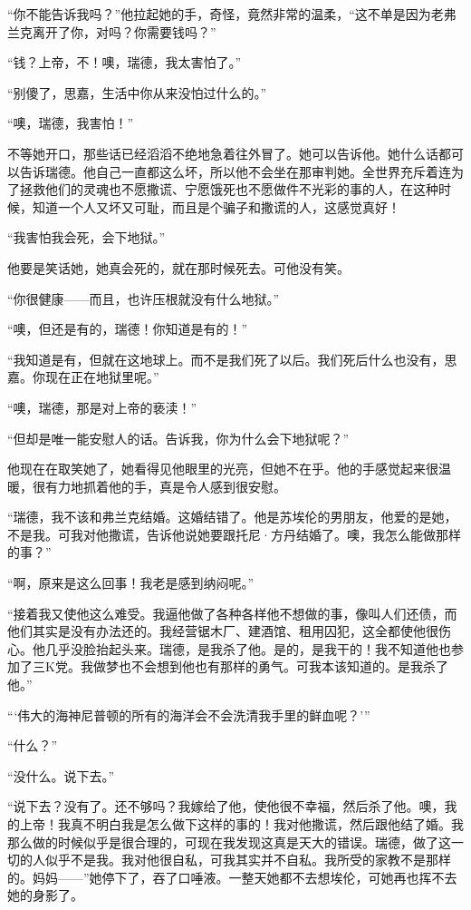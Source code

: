\par “你不能告诉我吗？”他拉起她的手，奇怪，竟然非常的温柔，“这不单是因为老弗兰克离开了你，对吗？你需要钱吗？”
\par “钱？上帝，不！噢，瑞德，我太害怕了。”
\par “别傻了，思嘉，生活中你从来没怕过什么的。”
\par “噢，瑞德，我害怕！”
\par 不等她开口，那些话已经滔滔不绝地急着往外冒了。她可以告诉他。她什么话都可以告诉瑞德。他自己一直都这么坏，所以他不会坐在那审判她。全世界充斥着连为了拯救他们的灵魂也不愿撒谎、宁愿饿死也不愿做件不光彩的事的人，在这种时候，知道一个人又坏又可耻，而且是个骗子和撒谎的人，这感觉真好！
\par “我害怕我会死，会下地狱。”
\par 他要是笑话她，她真会死的，就在那时候死去。可他没有笑。
\par “你很健康——而且，也许压根就没有什么地狱。”
\par “噢，但还是有的，瑞德！你知道是有的！”
\par “我知道是有，但就在这地球上。而不是我们死了以后。我们死后什么也没有，思嘉。你现在正在地狱里呢。”
\par “噢，瑞德，那是对上帝的亵渎！”
\par “但却是唯一能安慰人的话。告诉我，你为什么会下地狱呢？”
\par 他现在在取笑她了，她看得见他眼里的光亮，但她不在乎。他的手感觉起来很温暖，很有力地抓着他的手，真是令人感到很安慰。
\par “瑞德，我不该和弗兰克结婚。这婚结错了。他是苏埃伦的男朋友，他爱的是她，不是我。可我对他撒谎，告诉他说她要跟托尼·方丹结婚了。噢，我怎么能做那样的事？”
\par “啊，原来是这么回事！我老是感到纳闷呢。”
\par “接着我又使他这么难受。我逼他做了各种各样他不想做的事，像叫人们还债，而他们其实是没有办法还的。我经营锯木厂、建酒馆、租用囚犯，这全都使他很伤心。他几乎没脸抬起头来。瑞德，是我杀了他。是的，是我干的！我不知道他也参加了三K党。我做梦也不会想到他也有那样的勇气。可我本该知道的。是我杀了他。”
\par “‘伟大的海神尼普顿的所有的海洋会不会洗清我手里的鲜血呢？'”
\par “什么？”
\par “没什么。说下去。”
\par “说下去？没有了。还不够吗？我嫁给了他，使他很不幸福，然后杀了他。噢，我的上帝！我真不明白我是怎么做下这样的事的！我对他撒谎，然后跟他结了婚。我那么做的时候似乎是很合理的，可现在我发现这真是天大的错误。瑞德，做了这一切的人似乎不是我。我对他很自私，可我其实并不自私。我所受的家教不是那样的。妈妈——”她停下了，吞了口唾液。一整天她都不去想埃伦，可她再也挥不去她的身影了。
